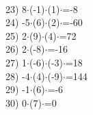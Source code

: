 \documentclass[a4paper,10pt]{article}
\begin{document}
\vspace{0.5cm}\\23)   8$\cdot$(-1)$\cdot$(1)$\cdot$=-8
\vspace{0.5cm}\\24)   -5$\cdot$(6)$\cdot$(2)$\cdot$=-60
\vspace{0.5cm}\\25)   2$\cdot$(9)$\cdot$(4)$\cdot$=72
\vspace{0.5cm}\\26)   2$\cdot$(-8)$\cdot$=-16
\vspace{0.5cm}\\27)   1$\cdot$(-6)$\cdot$(-3)$\cdot$=18
\vspace{0.5cm}\\28)   -4$\cdot$(4)$\cdot$(-9)$\cdot$=144
\vspace{0.5cm}\\29)   -1$\cdot$(6)$\cdot$=-6
\vspace{0.5cm}\\30)   0$\cdot$(7)$\cdot$=0
\vspace{0.5cm}\\\pagebreak
\end{document}
